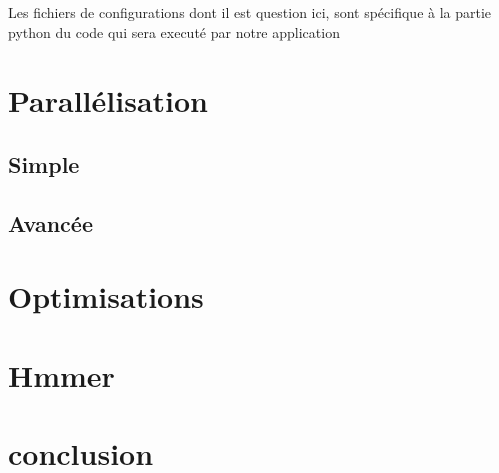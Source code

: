 Les fichiers de configurations dont il est question ici, sont spécifique à la partie python du code qui sera executé par notre application 
 

\section{Parallélisation}
	

\subsection{Simple}
\subsection{Avancée}

\section{Optimisations}

\section{Hmmer}

\section{conclusion}
